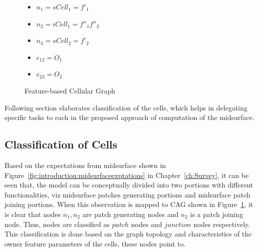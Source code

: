 \begin{figure}[!h]
\begin{minipage}[h]{0.22\linewidth}
\end{minipage}\hfill
\begin{minipage}[h]{0.38\linewidth} 
\begin{itemize}[noitemsep,topsep=2pt,parsep=2pt,partopsep=2pt]
\item $n_1 = sCell_1= f'_1$
\item $n_2 = iCell_1 = f''_1f''_2$
\item $n_3 = sCell_2 = f'_2$
\item $e_{12} = O_1$
\item $e_{23}= O_2$
\end{itemize}
\end{minipage}
\caption{Feature-based Cellular Graph}
\label{fig:midsurfcelljoin:featgraph}
\end{figure}



Following section elaborates classification of the cells, which helps in delegating specific tasks to each in the proposed approach of computation of the midsurface.

\subsection{Classification of Cells} \label{sec:midsurfcelljoin:classfication}

Based on the expectations from midsurface shown in Figure~\ref{fig:introduction:midsurfaceexptations} in Chapter~\ref{ch:Survey}, it can be seen that, the model can be conceptually divided into two portions with different functionalities, viz midsurface patches generating portions and midsurface patch joining portions. When this observation is mapped to CAG shown in Figure~\ref{fig:midsurfcelljoin:featgraph}, it is clear that nodes $n_1, n_2$ are patch generating nodes and $n_2$ is a patch joining node. Thus, nodes are classified as $patch$ nodes and $junction$ nodes respectively. This classification is done based on the graph topology and characteristics of the owner feature parameters of the cells, these nodes point to.

